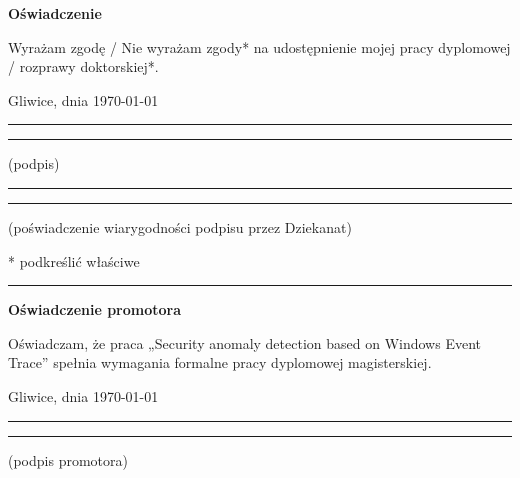 \documentclass[a4paper,twoside,12pt]{book}
\newcommand{\Title}{Security anomaly detection based on Windows Event Trace}
\begin{document}
\begin{center}
\Large\bfseries Oświadczenie
\end{center}

\vfill

Wyrażam  zgodę / Nie wyrażam zgody*  na  udostępnienie  mojej  pracy  dyplomowej / rozprawy doktorskiej*.

\vfill

Gliwice, dnia {\today}

\vfill

\rule{0.5\textwidth}{0cm}\dotfill 

\rule{0.5\textwidth}{0cm}
\begin{minipage}{0.45\textwidth}
{\begin{center}(podpis)\end{center}}
\end{minipage} 

\vfill

\rule{0.5\textwidth}{0cm}\dotfill 

\rule{0.5\textwidth}{0cm}
\begin{minipage}{0.45\textwidth}
{\begin{center}\rule{0mm}{5mm}(poświadczenie wiarygodności podpisu przez Dziekanat)\end{center}}
\end{minipage}


\vfill

* podkreślić właściwe

 


\cleardoublepage

\rule{1cm}{0cm}

\vfill  

\begin{center}
\Large\bfseries Oświadczenie promotora
\end{center}

\vfill

Oświadczam, że praca „\Title” spełnia wymagania formalne pracy dyplomowej magisterskiej.

\vfill



\vfill

Gliwice, dnia {\today}

\rule{0.5\textwidth}{0cm}\dotfill 

\rule{0.5\textwidth}{0cm}
\begin{minipage}{0.45\textwidth}
{\begin{center}(podpis promotora)\end{center}}
\end{minipage} 
\end{document}
